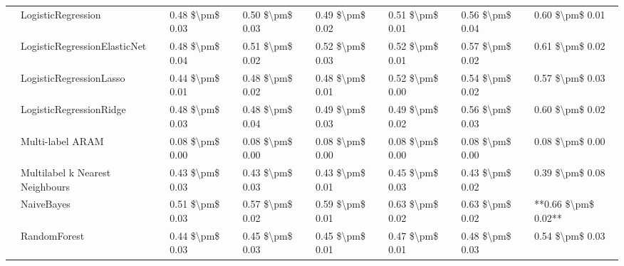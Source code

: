 \begin{tabular}{llllllll}
   & LogisticRegression &  0.48 \$\textbackslash pm\$ 0.03 &           0.50 \$\textbackslash pm\$ 0.03 &       0.49 \$\textbackslash pm\$ 0.02 &        0.51 \$\textbackslash pm\$ 0.01 &                         0.56 \$\textbackslash pm\$ 0.04 &      0.60 \$\textbackslash pm\$ 0.01 \\
   & LogisticRegressionElasticNet &  0.48 \$\textbackslash pm\$ 0.04 &           0.51 \$\textbackslash pm\$ 0.02 &       0.52 \$\textbackslash pm\$ 0.03 &        0.52 \$\textbackslash pm\$ 0.01 &                         0.57 \$\textbackslash pm\$ 0.02 &      0.61 \$\textbackslash pm\$ 0.02 \\
   & LogisticRegressionLasso &  0.44 \$\textbackslash pm\$ 0.01 &           0.48 \$\textbackslash pm\$ 0.02 &       0.48 \$\textbackslash pm\$ 0.01 &        0.52 \$\textbackslash pm\$ 0.00 &                         0.54 \$\textbackslash pm\$ 0.02 &      0.57 \$\textbackslash pm\$ 0.03 \\
   & LogisticRegressionRidge &  0.48 \$\textbackslash pm\$ 0.03 &           0.48 \$\textbackslash pm\$ 0.04 &       0.49 \$\textbackslash pm\$ 0.03 &        0.49 \$\textbackslash pm\$ 0.02 &                         0.56 \$\textbackslash pm\$ 0.03 &      0.60 \$\textbackslash pm\$ 0.02 \\
   & Multi-label ARAM &  0.08 \$\textbackslash pm\$ 0.00 &           0.08 \$\textbackslash pm\$ 0.00 &       0.08 \$\textbackslash pm\$ 0.00 &        0.08 \$\textbackslash pm\$ 0.00 &                         0.08 \$\textbackslash pm\$ 0.00 &      0.08 \$\textbackslash pm\$ 0.00 \\
   & Multilabel k Nearest Neighbours &  0.43 \$\textbackslash pm\$ 0.03 &           0.43 \$\textbackslash pm\$ 0.03 &       0.43 \$\textbackslash pm\$ 0.01 &        0.45 \$\textbackslash pm\$ 0.03 &                         0.43 \$\textbackslash pm\$ 0.02 &      0.39 \$\textbackslash pm\$ 0.08 \\
   & NaiveBayes &  0.51 \$\textbackslash pm\$ 0.03 &           0.57 \$\textbackslash pm\$ 0.02 &       0.59 \$\textbackslash pm\$ 0.01 &        0.63 \$\textbackslash pm\$ 0.02 &                         0.63 \$\textbackslash pm\$ 0.02 &  **0.66 \$\textbackslash pm\$ 0.02** \\
   & RandomForest &  0.44 \$\textbackslash pm\$ 0.03 &           0.45 \$\textbackslash pm\$ 0.03 &       0.45 \$\textbackslash pm\$ 0.01 &        0.47 \$\textbackslash pm\$ 0.01 &                         0.48 \$\textbackslash pm\$ 0.03 &      0.54 \$\textbackslash pm\$ 0.03 \\

\end{tabular}
